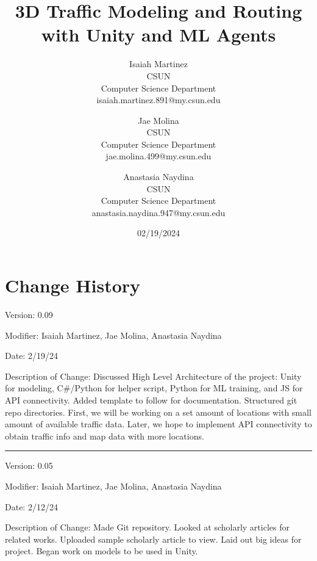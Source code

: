 \documentclass[a4paper,10pt]{article}
\begin{document}
%
    \title{3D Traffic Modeling and Routing with Unity and ML Agents}

    \author{
    
    Isaiah Martinez \\ CSUN \\ Computer Science Department \\ isaiah.martinez.891@my.csun.edu
    
    \and
    
    Jae Molina \\ CSUN \\ Computer Science Department \\ jae.molina.499@my.csun.edu
    
    \and
    
    Anastasia Naydina \\ CSUN \\ Computer Science Department \\ anastasia.naydina.947@my.csun.edu
    
    }
          
    \date{02/19/2024}

    \maketitle
   
    \tableofcontents
 
    \newpage

    \section{Change History}

    Version: 0.09

    Modifier: Isaiah Martinez, Jae Molina, Anastasia Naydina
    
    Date: 2/19/24
    
    Description of Change: Discussed High Level Architecture of the project: Unity for modeling, C\#/Python for helper script, Python for ML training, and JS for API connectivity.
    Added template to follow for documentation.
    Structured git repo directories.
    First, we will be working on a set amount of locations with small amount of available traffic data.
    Later, we hope to implement API connectivity to obtain traffic info and map data with more locations.
 
    \noindent\rule{12cm}{0.4pt}

    Version: 0.05

    Modifier: Isaiah Martinez, Jae Molina, Anastasia Naydina
    
    Date: 2/12/24
    
    Description of Change: Made Git repository. 
    Looked at scholarly articles for related works.
    Uploaded sample scholarly article to view.
    Laid out big ideas for project.
    Began work on models to be used in Unity.

    

    
\end{document}
